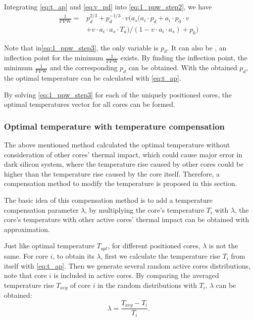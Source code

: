 Integrating \eqref{eq:t_ap} and \eqref{eq:v_pd} into \eqref{eq:1_ppw_step2}, we have
\begin{equation}\label{eq:1_ppw_step3}
\begin{split}
\frac{1}{\text{PPW}} = &p_{d}^{2/3}+p_{d}^{-1/3}\cdot v(a_{s}(a_{i} \cdot p_{d}+a_{i} \cdot p_{0} \cdot v\\
 &+ v \cdot a_{i} \cdot a_{s} \cdot T_{a})/(1-v \cdot a_{i} \cdot a_{s})+p_{0})
\end{split}
\end{equation}

Note that in\eqref{eq:1_ppw_step3}, the only variable is $p_{d}$. It can also be , an inflection point for the minimum $\frac{1}{\text{PPW}}$ exists. By finding the inflection point, the minimum $\frac{1}{\text{PPW}}$ and the corresponding $p_{d}$ can be obtained. With the obtained $p_{d}$, the optimal temperature can be calculated with \eqref{eq:t_ap}.

By solving \eqref{eq:1_ppw_step3} for each of the uniquely positioned cores, the optimal temperatures vector for all cores can be formed.


\subsubsection{Optimal temperature with temperature compensation}

The above mentioned method calculated the optimal temperature without consideration of other cores' thermal impact, which could cause major error in dark silicon system, where the temperature rise caused by other cores could be higher than the temperature rise caused by the core itself. Therefore, a compensation method to modify the temperature is proposed in this section.

The basic idea of this compensation method is to add a temperature compensation parameter $\lambda$, by multiplying the core's temperature $T_{i}$ with $\lambda$, the core's temperature with other active cores' thermal impact can be obtained with approximation.

Just like optimal temperature $T_{opt}$, for different positioned cores, $\lambda$ is not the same. For core $i$, to obtain its $\lambda$, first we calculate the temperature rise $T_{i}$ from itself with \eqref{eq:t_ap}. Then we generate several random active cores distributions, note that core $i$ is included in active cores. By comparing the averaged temperature rise $T_{avg}$ of core $i$ in the random distributions with $T_{i}$, $\lambda$ can be obtained:
\begin{equation}\label{eq:lambda}
\lambda = \frac{T_{avg}-T_{i}}{T_{i}}.
\end{equation}

